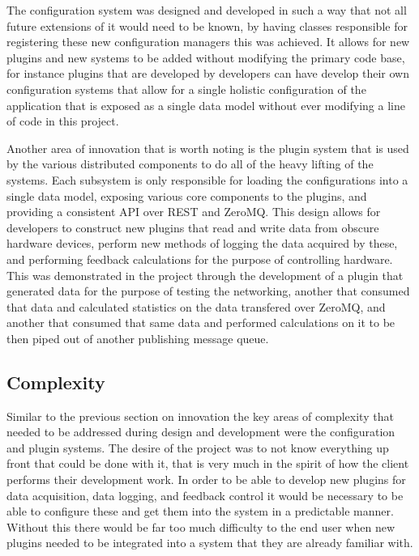     The configuration system was designed and developed in such a way that not
    all future extensions of it would need to be known, by having classes
    responsible for registering these new configuration managers this was
    achieved. It allows for new plugins and new systems to be added without
    modifying the primary code base, for instance plugins that are developed by
    developers can have develop their own configuration systems that allow for a
    single holistic configuration of the application that is exposed as a single
    data model without ever modifying a line of code in this project.

    Another area of innovation that is worth noting is the plugin system that is
    used by the various distributed components to do all of the heavy lifting of
    the systems. Each subsystem is only responsible for loading the
    configurations into a single data model, exposing various core components to
    the plugins, and providing a consistent API over REST and ZeroMQ. This
    design allows for developers to construct new plugins that read and write
    data from obscure hardware devices, perform new methods of logging the data
    acquired by these, and performing feedback calculations for the purpose of
    controlling hardware. This was demonstrated in the project through the
    development of a plugin that generated data for the purpose of testing the
    networking, another that consumed that data and calculated statistics on the
    data transfered over ZeroMQ, and another that consumed that same data and
    performed calculations on it to be then piped out of another publishing
    message queue.

  \subsection{Complexity}\label{sec:desc-complexity}

    Similar to the previous section on innovation the key areas of complexity
    that needed to be addressed during design and development were the
    configuration and plugin systems. The desire of the project was to not know
    everything up front that could be done with it, that is very much in the
    spirit of how the client performs their development work. In order to be
    able to develop new plugins for data acquisition, data logging, and feedback
    control it would be necessary to be able to configure these and get them
    into the system in a predictable manner. Without this there would be far too
    much difficulty to the end user when new plugins needed to be integrated
    into a system that they are already familiar with.

